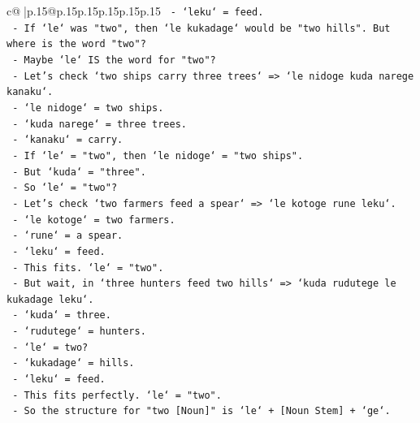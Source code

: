 \documentclass{article}
\begin{document}
{\begin{supertabular}{c@{$\;$}|p{.15\linewidth}@{}p{.15\linewidth}p{.15\linewidth}p{.15\linewidth}p{.15\linewidth}p{.15\linewidth}}
{{{\texttt{                     {-} `leku` = feed.} \\
\texttt{                     {-} If `le` was "two", then `le kukadage` would be "two hills". But where is the word "two"?} \\
\texttt{                     {-} Maybe `le` IS the word for "two"?} \\
\texttt{                     {-} Let's check `two ships carry three trees` => `le nidoge kuda narege kanaku`.} \\
\texttt{                       {-} `le nidoge` = two ships.} \\
\texttt{                       {-} `kuda narege` = three trees.} \\
\texttt{                       {-} `kanaku` = carry.} \\
\texttt{                       {-} If `le` = "two", then `le nidoge` = "two ships".} \\
\texttt{                       {-} But `kuda` = "three".} \\
\texttt{                       {-} So `le` = "two"?} \\
\texttt{                       {-} Let's check `two farmers feed a spear` => `le kotoge rune leku`.} \\
\texttt{                         {-} `le kotoge` = two farmers.} \\
\texttt{                         {-} `rune` = a spear.} \\
\texttt{                         {-} `leku` = feed.} \\
\texttt{                       {-} This fits. `le` = "two".} \\
\texttt{                       {-} But wait, in `three hunters feed two hills` => `kuda rudutege le kukadage leku`.} \\
\texttt{                         {-} `kuda` = three.} \\
\texttt{                         {-} `rudutege` = hunters.} \\
\texttt{                         {-} `le` = two?} \\
\texttt{                         {-} `kukadage` = hills.} \\
\texttt{                         {-} `leku` = feed.} \\
\texttt{                         {-} This fits perfectly. `le` = "two".} \\
\texttt{                       {-} So the structure for "two {[}Noun{]}" is `le` + {[}Noun Stem{]} + `ge`.} \\
}}}
\end{supertabular}}
\end{document}
